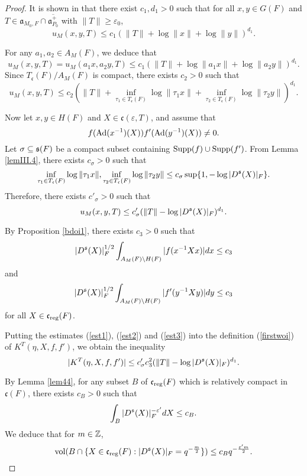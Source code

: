 \documentclass[a4paper]{amsart}
\newcommand{\fa}{{\mathfrak{a}}} \newcommand{\fb}{{\mathfrak{b}}}\newcommand{\fc}{{\mathfrak{c}}} \newcommand{\fd}{{\mathfrak{d}}}
\newcommand{\ov}{\overline}
\newcommand{\vol}{{\mathrm{vol}}}                   \newcommand{\Vol}{{\mathrm{Vol}}}
\theoremstyle{definition}
\theoremstyle{remark}
\numberwithin{equation}{subsection}
\begin{document}
\begin{proof}
It is shown in \cite[(4.8) in p. 31]{MR1114210} that there exist $c_1,d_1>0$ such that for all $x,y\in G(F)$ and $T\in\fa_{M_0,F}\cap\ov{\fa_{P_0}^+}$ with $\|T\|\geq\varepsilon_0$, 
$$ u_M(x, y, T) \leq c_1 (\| T\| + \log \| x\| + \log \| y\|)^{d_1}. $$

For any $a_1,a_2\in A_M(F)$, we deduce that
$$ u_M(x, y, T)=u_M(a_1 x, a_2 y, T)\leq c_1 (\|T\| + \log\|a_1 x\| + \log\|a_2 y\|)^{d_1}. $$
Since $T_\fc(F)/A_M(F)$ is compact, there exists $c_2>0$ such that
$$ u_M(x, y, T)\leq c_2 (\|T\| + \inf_{\tau_1\in T_\fc(F)} \log\|\tau_1 x\| + \inf_{\tau_2\in T_\fc(F)} \log\|\tau_2 y\|)^{d_1}. $$

Now let $x,y\in H(F)$ and $X\in\fc(\varepsilon,T)$, and assume that
$$ f({\mathrm{Ad}}(x^{-1})(X))f'({\mathrm{Ad}}(y^{-1})(X))\neq0. $$
Let $\sigma\subseteq{\mathfrak{s}}(F)$ be a compact subset containing ${\mathrm{Supp}}(f)\cup{\mathrm{Supp}}(f')$. From Lemma \ref{lemIII.4}, there exists $c_\sigma>0$ such that
$$ \inf_{\tau_1\in T_\fc(F)} \log\|\tau_1 x\|, \inf_{\tau_2\in T_\fc(F)} \log\|\tau_2 y\|\leq c_\sigma\sup\{1,-\log|D^\fs(X)|_F\}. $$
Therefore, there exists $c'_\sigma>0$ such that
\begin{equation}\label{est1}
 u_M(x, y, T) \leq c'_\sigma (\| T\| - \log |D^{\mathfrak{s}}(X)|_F)^{d_1}. 
\end{equation}

By Proposition \ref{bdoi1}, there exists $c_3>0$ such that
\begin{equation}\label{est2}
 |D^{\mathfrak{s}}(X)|_F^{1/2}\int_{A_M(F)\backslash H(F)} |f(x^{-1}Xx)| dx \leq c_3 
\end{equation}
and 
\begin{equation}\label{est3}
 |D^{\mathfrak{s}}(X)|_F^{1/2}\int_{A_M(F)\backslash H(F)} |f'(y^{-1}Xy)| dy \leq c_3 
\end{equation}
for all $X\in\fc_\reg(F)$. 

Putting the estimates (\ref{est1}), (\ref{est2}) and (\ref{est3}) into the definition (\ref{firstwoi}) of $K^T(\eta, X, f, f')$, we obtain the inequality
$$ |K^T(\eta, X, f, f')| \leq c'_\sigma c_3^2 (\| T\| - \log |D^{\mathfrak{s}}(X)|_F)^{d_1}. $$

By Lemma \ref{lem44}, for any subset $B$ of $\fc_\reg(F)$ which is relatively compact in $\fc(F)$, there exists $c_B>0$ such that 
$$ \int_{B} |D^{\mathfrak{s}}(X)|_F^{-\varepsilon'} dX\leq c_B. $$ 
We deduce that for $m\in{\mathbb {Z}}$, 
\begin{equation}\label{strengthenlem44}
 \vol(B\cap\{X\in\fc_\reg(F): |D^\fs(X)|_F=q^{-\frac{m}{2}}\})\leq c_B q^{-\frac{\varepsilon'm}{2}}. 
\end{equation}
 

\end{proof}
\end{document}
